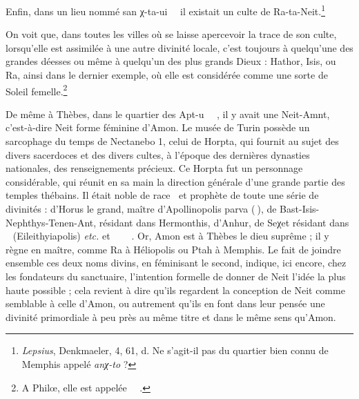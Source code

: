 \documentclass[letterpaper,twocolumn,openany,nodeprecatedcode]{dndbook}
\newcommand*\hieroAAAC{}
\newcommand*\hieroAAAH{}
\newcommand*\hieroAAAX{}
\newcommand*\hieroAAAZ{}
\newcommand*\hieroAABC{\raisebox{0.5ex}{}}
\newcommand*\hieroAACB{\raisebox{0.5ex}{}}
\newcommand*\hieroAACS{}
\newcommand*\hieroAAFD{}
\newcommand*\hieroAAFT{}
\newcommand*\hieroAAHY{}
\newcommand*\hieroAAII{}
\newcommand*\hieroAAIQ{}
\newcommand*\hieroAAJW{}
\newcommand*\hieroAALR{\raisebox{0.3ex}{}}
\newcommand*\hieroAARZ{}
\newcommand*\hieroAAVQ{}
\newcommand*\hieroAAXI{}
\newcommand*\hieroAAXJ{\raisebox{0.3ex}{}}
\newcommand*\hieroAAXK{}
\newcommand*\hieroAAXL{}
\newcommand*\hieroAAXM{}
\newcommand*\hieroAAXN{}
\newcommand*\hieroAAXO{}
\newcommand*\hieroAAXP{}
\newcommand*\hieroAAXQ{\raisebox{0.5ex}{}}
\newcommand*\hieroAAXR{}
\begin{document}
Enfin, dans un lieu nommé san χ-ta-ui $\hieroAACS\:\hieroAARZ\allowbreak\:\hieroAAVQ\:\hieroAAXI$ il existait un culte de Ra-ta-Neit.\footnote{\emph{Lepsius}, Denkmaeler, 4, 61, d. Ne s'agit-il pas du quartier bien connu de Memphis appelé \emph{anχ-to} ?}

On voit que, dans toutes les villes où se laisse apercevoir la trace de son culte, lorsqu'elle est assimilée à une autre divinité locale, c'est toujours à quelqu'une des grandes déesses ou même à quelqu'un des plus grands Dieux : Hathor, Isis, ou Ra, ainsi dans le dernier exemple, où elle est considérée comme une sorte de Soleil femelle.\footnote{A Philœ, elle est appelée $\hieroAAAZ\:\hieroAAXQ\:\hieroAAII\allowbreak\:\hieroAABC\:\hieroAAXR$.}

De même à Thèbes, dans le quartier des Apt-u $\hieroAAXJ\:\hieroAACB\:\hieroAAHY\allowbreak\:\hieroAAHY\:\hieroAAHY$, il y avait une Neit-Amnt, c'est-à-dire Neit forme féminine d'Amon. Le musée de Turin possède un sarcophage du temps de Nectanebo 1, celui de Horpta, qui fournit au sujet des divers sacerdoces et des divers cultes, à l'époque des dernières dynasties nationales, des renseignements précieux. Ce Horpta fut un personnage considérable, qui réunit en sa main la direction générale d'une grande partie des temples thébains. Il était noble de race $\hieroAAXK\:\hieroAAJW$ et prophète de toute une série de divinités : d'Horus le grand, maître d'Apollinopolis parva ($\hieroAAXL\:\hieroAAAC$), de Bast-Isis-Nephthys-Tenen-Ant, résidant dans Hermonthis, d'Anhur, de Seχet résidant dans $\hieroAAAX\:\hieroAAFD\:\hieroAAXM$ (Eileithyiapolis) \emph{etc.} et $\hieroAAXN\:\hieroAALR\:\hieroAAAH\allowbreak\:\hieroAAXO\:\hieroAAIQ\:\hieroAAAH\allowbreak\:\hieroAAXP\:\hieroAAHY\:\hieroAAFT$. Or, Amon est à Thèbes le dieu suprême ; il y règne en maître, comme Ra à Héliopolis ou Ptah à Memphis. Le fait de joindre ensemble ces deux noms divins, en féminisant le second, indique, ici encore, chez les fondateurs du sanctuaire, l'intention formelle de donner de Neit l'idée la plus haute possible ; cela revient à dire qu'ils regardent la conception de Neit comme semblable à celle d'Amon, ou autrement qu'ils en font dans leur pensée une divinité primordiale à peu près au même titre et dans le même sens qu'Amon.
\end{document}
